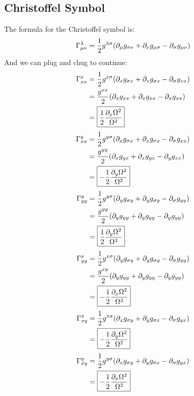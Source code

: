 \documentclass[12pt]{article}
\newcommand{\D}{\partial}
\begin{document}
\subsection{Christoffel Symbol}
The formula for the Christoffel symbol is:
\begin{align*}
  \Gamma^\lambda_{\mu\nu}=\frac{1}{2}g^{\lambda\sigma}
  \qty(\D_\mu g_{\sigma\nu}+\D_\nu g_{\mu\sigma}-\D_\sigma g_{\mu\nu})
\end{align*}
And we can plug and chug to continue:
\begin{align*}
  \Gamma^x_{xx}&=\frac{1}{2}g^{x\sigma}
  \qty(\D_xg_{\sigma x}+\D_x g_{\sigma x}-\D_\sigma g_{xx})\\
  &=\frac{g^{xx}}{2}\qty(\D_x g_{xx}+\D_x g_{xx}-\D_xg_{xx})\\
  &=\boxed{\frac{1}{2}\frac{\D_x\Omega^2}{\Omega^2}}
\end{align*}
\begin{align*}
  \Gamma^y_{xx}&=\frac{1}{2}g^{y\sigma}
  \qty(\D_xg_{\sigma x}+\D_x g_{\sigma x}-\D_\sigma g_{xx})\\
  &=\frac{g^{yy}}{2}\qty(\D_x g_{yx}+\D_x g_{yx}-\D_yg_{xx})\\
  &=\boxed{-\frac{1}{2}\frac{\D_y\Omega^2}{\Omega^2}}
\end{align*}
\begin{align*}
  \Gamma^y_{yy}&=\frac{1}{2}g^{y\sigma}
  \qty(\D_yg_{\sigma y}+\D_y g_{\sigma y}-\D_\sigma g_{yy})\\
  &=\frac{g^{yy}}{2}\qty(\D_y g_{yy}+\D_y g_{yy}-\D_yg_{yy})\\
  &=\boxed{\frac{1}{2}\frac{\D_y\Omega^2}{\Omega^2}}
\end{align*}
\begin{align*}
  \Gamma^x_{yy}&=\frac{1}{2}g^{x\sigma}
  \qty(\D_yg_{\sigma y}+\D_y g_{\sigma y}-\D_\sigma g_{yy})\\
  &=\frac{g^{xy}}{2}\qty(\D_y g_{yy}+\D_y g_{yy}-\D_yg_{yy})\\
  &=\boxed{-\frac{1}{2}\frac{\D_x\Omega^2}{\Omega^2}}
\end{align*}
\begin{align*}
  \Gamma^x_{xy}&=\frac{1}{2}g^{x\sigma}
  \qty(\D_xg_{\sigma y}+\D_y g_{\sigma x}-\D_\sigma g_{yx})\\
  &=\boxed{-\frac{1}{2}\frac{\D_y\Omega^2}{\Omega^2}}
\end{align*}
\begin{align*}
  \Gamma^y_{xy}&=\frac{1}{2}g^{y\sigma}
  \qty(\D_xg_{\sigma y}+\D_y g_{\sigma x}-\D_\sigma g_{yx})\\
  &=\boxed{-\frac{1}{2}\frac{\D_x\Omega^2}{\Omega^2}}
\end{align*}
\end{document}

